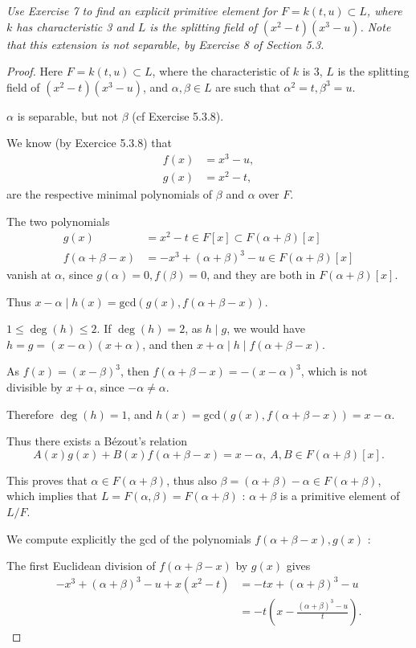 \documentclass[11pt,a4paper]{article}
\begin{document}
{\it Use Exercise 7 to find an explicit primitive element for $F = k(t,u) \subset L$, where $k$ has characteristic 3 and $L$ is the splitting field of $(x^2-t)(x^3-u)$. Note that this extension is not separable, by Exercise 8 of Section 5.3.
}

\begin{proof}
Here $F=k(t,u)\subset L$, where the characteristic of $k$ is 3, $L$ is the splitting field of $(x^2-t)(x^3-u)$, and $\alpha,\beta \in L$ are such that $\alpha^2 = t, \beta^3 = u$.


$\alpha$ is separable, but not $\beta$ (cf Exercise 5.3.8).

We know (by Exercice 5.3.8) that 
\begin{align*}
f(x)&=x^3-u,\\
g(x) &= x^2-t,
\end{align*}
are the respective minimal polynomials of $\beta$ and $\alpha$ over $F$.

The two polynomials 
\begin{align*}
g(x) &= x^2-t \in F[x] \subset F(\alpha+\beta)[x]\\
f(\alpha+\beta-x) &= -x^3 +(\alpha+\beta)^3 - u \in F(\alpha+\beta)[x]
\end{align*}
vanish at $\alpha$, since $g(\alpha) = 0, f(\beta) = 0$, and they are both in ${F(\alpha+\beta)[x]}$.

Thus $x-\alpha \mid h(x) = \mathrm{gcd}(g(x),f(\alpha+\beta -x))$.

$1\leq \deg(h) \leq 2$. If $\deg(h) = 2$, as $h\mid g$, we would have $h=g = (x-\alpha)(x+\alpha)$, and then $x+\alpha  \mid h \mid f(\alpha+\beta-x)$.

As $f(x) = (x-\beta)^3$, then $f(\alpha+\beta-x) = -(x-\alpha)^3$, which is not divisible by $x+\alpha$, since $-\alpha \neq \alpha$.

Therefore $\deg(h) = 1$, and $h(x) =\mathrm{gcd}(g(x),f(\alpha+\beta - x)) = x-\alpha$.

Thus there exists a B\'ezout's relation 
$$A(x) g(x) + B(x) f(\alpha+\beta - x) = x- \alpha, \ A,B \in F(\alpha+\beta)[x].$$

This proves that $\alpha \in F(\alpha+\beta)$, thus also $\beta = (\alpha+ \beta) - \alpha \in F(\alpha+\beta)$, which implies that $L = F(\alpha,\beta) = F(\alpha+\beta)$ : $\alpha+\beta$ is a primitive element of $L/F$.

We compute explicitly the gcd of the polynomials  $f(\alpha+\beta -x), g(x)$  :

The first Euclidean division of $f(\alpha+\beta -x)$ by $g(x)$ gives 
\begin{align*}
-x^3+(\alpha+\beta)^3-u + x(x^2-t) &= -tx +(\alpha+\beta)^3 - u\\
&= -t\left(x-\frac{(\alpha+\beta)^3 - u}{t} \right).
\end{align*}


\end{proof}
\end{document}
